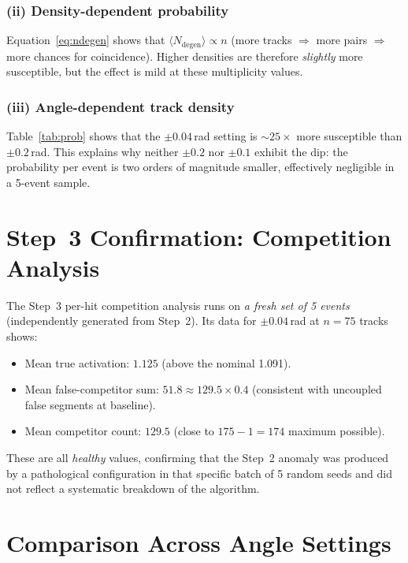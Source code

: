 \documentclass[12pt,a4paper]{article}
\begin{document}
\subsubsection*{(ii) Density-dependent probability}

Equation~\eqref{eq:ndegen} shows that $\langle N_\text{degen}\rangle \propto n$
(more tracks $\Rightarrow$ more pairs $\Rightarrow$ more chances for
coincidence).
Higher densities are therefore \emph{slightly} more susceptible, but the
effect is mild at these multiplicity values.

\subsubsection*{(iii) Angle-dependent track density}

Table~\ref{tab:prob} shows that the $\pm0.04$\,rad setting is
$\sim$$25\times$ more susceptible than $\pm0.2$\,rad.
This explains why neither $\pm0.2$ nor $\pm0.1$ exhibit the dip:
the probability per event is two orders of magnitude smaller,
effectively negligible in a 5-event sample.

\section{Step~3 Confirmation: Competition Analysis}
\label{sec:step3}

The Step~3 per-hit competition analysis runs on \emph{a fresh set of 5 events}
(independently generated from Step~2).
Its data for $\pm0.04$\,rad at $n=75$ tracks shows:
\begin{itemize}
  \item Mean true activation: $1.125$ (above the nominal 1.091).
  \item Mean false-competitor sum: $51.8 \approx 129.5 \times 0.4$
        (consistent with uncoupled false segments at baseline).
  \item Mean competitor count: $129.5$ (close to $175 - 1 = 174$ maximum possible).
\end{itemize}
These are all \emph{healthy} values, confirming that the Step~2 anomaly
was produced by a pathological configuration in that specific batch of
5 random seeds and did not reflect a systematic breakdown of the algorithm.

\section{Comparison Across Angle Settings}
\label{sec:comparison}
\end{document}
